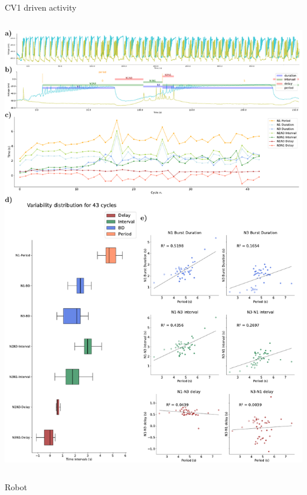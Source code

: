 \documentclass[aspectratio=43]{beamer}
\begin{document}
\begin{frame}{CV1 driven activity}
\begin{columns}
\begin{column}{0.5\textwidth}
		\includegraphics[width=\textwidth]{invariants/data/SUSSEX/CV1a_driven2/images/panel_with_intervals.pdf}
		\end{column}
	\end{columns}
\end{frame}

\begin{frame}{Robot}
\end{frame}
\end{document}

